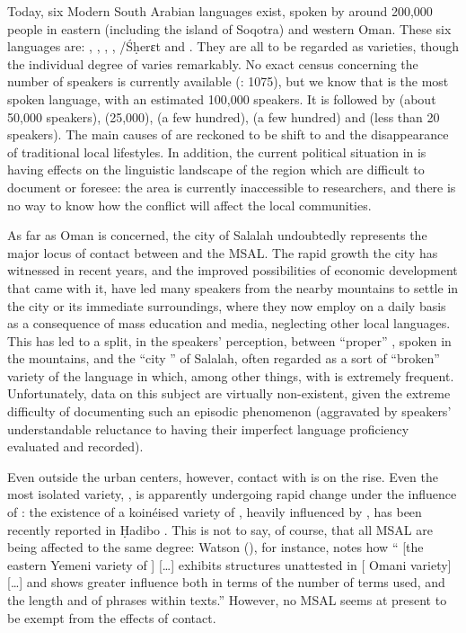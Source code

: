 \documentclass[output=paper]{langsci/langscibook}
\begin{document}
Today, six Modern South Arabian languages exist, spoken by around 200,000 people in eastern  (including the island of Soqotra) and western Oman. These six languages are: , , , , /Śḥerɛt and . They are all to be regarded as  varieties, though the individual degree of  varies remarkably. No exact census concerning the number of speakers is currently available (\citealt{Simeone-Senelle2011}: 1075), but we know that  is the most spoken language, with an estimated 100,000 speakers. It is followed by  (about 50,000 speakers),  (25,000),  (a few hundred),  (a few hundred) and  (less than 20 speakers). The main causes of  are reckoned to be shift to  and the disappearance of traditional local lifestyles. In addition, the current political situation in  is having effects on the linguistic landscape of the region which are difficult to document or foresee: the area is currently inaccessible to researchers, and there is no way to know how the conflict will affect the local communities.

As far as Oman is concerned, the city of Salalah undoubtedly represents the major locus of contact between  and the MSAL. The rapid growth the city has witnessed in recent years, and the improved possibilities of economic development that came with it, have led many  speakers from the nearby mountains to settle in the city or its immediate surroundings, where they now employ  on a daily basis as a consequence of mass education and media, neglecting other local languages. This has led to a split, in the speakers’ perception, between ``proper'' , spoken in the mountains, and the ``city '' of Salalah, often regarded as a sort of ``broken'' variety of the language in which, among other things,  with  is extremely frequent. Unfortunately, data on this subject are virtually non-existent, given the extreme difficulty of documenting such an episodic phenomenon (aggravated by speakers’ understandable reluctance to having their imperfect language proficiency evaluated and recorded). 

Even outside the urban centers, however, contact with  is on the rise. Even the most isolated variety, , is apparently undergoing rapid change under the influence of : the existence of a koinéised variety of , heavily influenced by , has been recently reported in Ḥadibo \citep[27]{Morris2017}. This is not to say, of course, that all MSAL are being affected to the same degree: Watson (\citeyear[3]{Watson2012}), for instance, notes how “ [the eastern {Yemeni} variety of ] […] exhibits structures unattested in  [ Omani variety] […] and shows greater  influence both in terms of the number of  terms used, and the length and  of  phrases within texts.” However, no MSAL seems at present to be exempt from the effects of contact.
\end{document}
